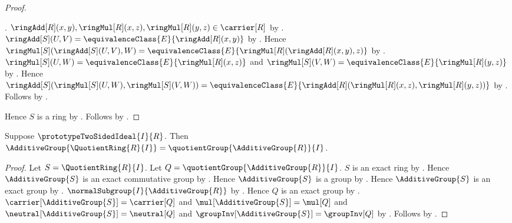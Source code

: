 \begin{proof}
\begin{subproof}
            .
        $\ringAdd[R](x,y),\ringMul[R](x,z),
            \ringMul[R](y,z)\in\carrier[R]$ by
            .
        $\ringAdd[S](U,V)=
            \equivalenceClass{E}{\ringAdd[R](x,y)}$ by
            .
        Hence $\ringMul[S](\ringAdd[S](U,V),W)=
            \equivalenceClass{E}{
                \ringMul[R](\ringAdd[R](x,y),z)}$ by
            .
        $\ringMul[S](U,W)=
            \equivalenceClass{E}{\ringMul[R](x,z)}$ and
            $\ringMul[S](V,W)=
            \equivalenceClass{E}{\ringMul[R](y,z)}$ by
            .
        Hence
            $\ringAdd[S](\ringMul[S](U,W),\ringMul[S](V,W))=
                \equivalenceClass{E}{
                    \ringAdd[R](\ringMul[R](x,z),
                                \ringMul[R](y,z))}$ by
            .
        Follows by .
    \end{subproof}
    Hence $S$ is a ring by
        .
    Follows by .
\end{proof}

\begin{theorem}\label{spike_quotient_ring_additive_reduct}
    Suppose $\prototypeTwoSidedIdeal{I}{R}$.
    Then
        $\AdditiveGroup{\QuotientRing{R}{I}}
            =\quotientGroup{\AdditiveGroup{R}}{I}$.
\end{theorem}
\begin{proof}
    Let $S=\QuotientRing{R}{I}$.
    Let $Q=\quotientGroup{\AdditiveGroup{R}}{I}$.
    $S$ is an exact ring by .
    Hence $\AdditiveGroup{S}$ is an exact commutative group by
        .
    Hence $\AdditiveGroup{S}$ is a group by
        .
    Hence $\AdditiveGroup{S}$ is an exact group by
        .
    $\normalSubgroup{I}{\AdditiveGroup{R}}$ by
        .
    Hence $Q$ is an exact group by
        .
    $\carrier[\AdditiveGroup{S}]=\carrier[Q]$ and
        $\mul[\AdditiveGroup{S}]=\mul[Q]$ and
        $\neutral[\AdditiveGroup{S}]=\neutral[Q]$ and
        $\groupInv[\AdditiveGroup{S}]=\groupInv[Q]$ by
        .
    Follows by .
\end{proof}

